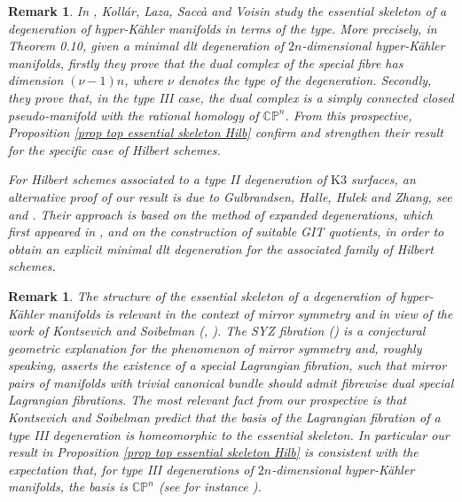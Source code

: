 \documentclass{amsart}%
\numberwithin{equation}{subsection}
\theoremstyle{plain2}
\theoremstyle{definition2}
\newtheorem{rem}[equation]{Remark}
\theoremstyle{stepstyle}
\theoremstyle{point}
\theoremstyle{subpoint}
\newcommand{\CP}{\ensuremath{\mathbb{CP}}}
\begin{document}
{\begin{rem}
In \cite{KollarLazaSaccaEtAl2017}, Koll\'{a}r, Laza, Sacc\`{a} and Voisin study the essential skeleton of a degeneration of hyper-K\"{a}hler manifolds in terms of the type. More precisely, in Theorem 0.10, given a minimal dlt degeneration of $2n$-dimensional hyper-K\"{a}hler manifolds, firstly they prove that the dual complex of the special fibre has dimension $(\nu-1)n$, where $\nu$ denotes the type of the degeneration. Secondly, they prove that, in the type III case, the dual complex is a simply connected closed pseudo-manifold with the rational homology of $\CP^n$. From this prospective, Proposition \ref{prop top essential skeleton Hilb} confirm and strengthen their result for the specific case of Hilbert schemes.

For Hilbert schemes associated to a type II degeneration of $\text{K}3$ surfaces, an alternative proof of our result is due to Gulbrandsen, Halle, Hulek and Zhang, see \cite{GulbrandsenHalleHulek2016} and \cite{GulbrandsenHalleHulekEtAl}. Their approach is based on the method of \textit{expanded degenerations}, which first appeared in \cite{Li}, and on the construction of suitable GIT quotients, in order to obtain an explicit minimal dlt degeneration for the associated family of Hilbert schemes. 
\end{rem}

\begin{rem}
The structure of the essential skeleton of a degeneration of hyper-K\"{a}hler manifolds is relevant in the context of mirror symmetry and in view of the work of Kontsevich and Soibelman (\cite{KontsevichSoibelmana}, \cite{KontsevichSoibelman}). The SYZ fibration (\cite{StromingerYauZaslow}) is a conjectural geometric explanation for the phenomenon of mirror symmetry and, roughly speaking, asserts the existence of a special Lagrangian fibration, such that mirror pairs of manifolds with trivial canonical bundle should admit fibrewise dual special Lagrangian fibrations. The most relevant fact from our prospective is that Kontsevich and Soibelman predict that the basis of the Lagrangian fibration of a type III degeneration is homeomorphic to the essential skeleton. In particular our result in Proposition \ref{prop top essential skeleton Hilb} is consistent with the expectation that, for type III degenerations of $2n$-dimensional hyper-K\"{a}hler manifolds, the basis is $\CP^n$ (see for instance \cite{Hwang}).
\end{rem}
}
\end{document}
